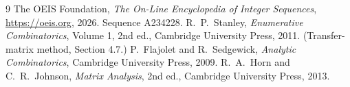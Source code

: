 \documentclass[11pt,a4paper]{article}
\theoremstyle{plain}
\theoremstyle{definition}
\begin{document}
\begin{thebibliography}{9}
 The OEIS Foundation, \emph{The On-Line Encyclopedia of Integer
Sequences}, \url{https://oeis.org}, 2026. Sequence A234228.
 R.~P.~Stanley, \emph{Enumerative Combinatorics}, Volume 1, 2nd ed.,
Cambridge University Press, 2011. (Transfer-matrix method, Section 4.7.)
 P.~Flajolet and R.~Sedgewick, \emph{Analytic Combinatorics}, Cambridge
University Press, 2009.
 R.~A.~Horn and C.~R.~Johnson, \emph{Matrix Analysis}, 2nd ed., Cambridge
University Press, 2013.
\end{thebibliography}
\end{document}

